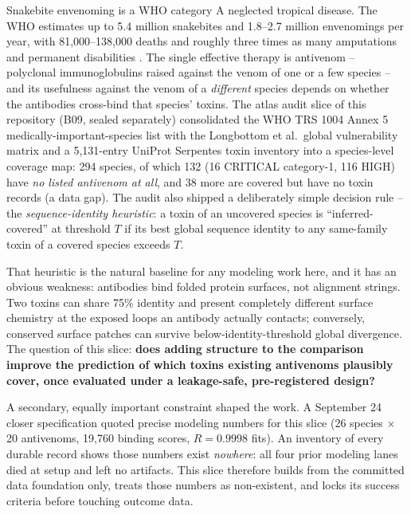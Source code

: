 \documentclass[11pt]{article}
\makeatletter
\renewcommand{\section}{\@startsection{section}{1}{\z@}{3.5ex plus 1ex minus .2ex}{2.3ex plus .2ex}{\Large\bfseries\color{paperblue}}}
\makeatother
\begin{document}
\section{Problem}
Snakebite envenoming is a WHO category A neglected tropical disease. The WHO estimates up to 5.4 million snakebites and 1.8--2.7 million envenomings per year, with 81,000--138,000 deaths and roughly three times as many amputations and permanent disabilities \cite{who-factsheet}. The single effective therapy is antivenom -- polyclonal immunoglobulins raised against the venom of one or a few species -- and its usefulness against the venom of a \emph{different} species depends on whether the antibodies cross-bind that species' toxins. The atlas audit slice of this repository (B09, sealed separately) consolidated the WHO TRS 1004 Annex 5 medically-important-species list \cite{who-trs1004} with the Longbottom et al.\ global vulnerability matrix \cite{longbottom2018} and a 5,131-entry UniProt Serpentes toxin inventory into a species-level coverage map: 294 species, of which 132 (16 CRITICAL category-1, 116 HIGH) have \emph{no listed antivenom at all}, and 38 more are covered but have no toxin records (a data gap). The audit also shipped a deliberately simple decision rule -- the \emph{sequence-identity heuristic}: a toxin of an uncovered species is ``inferred-covered'' at threshold $T$ if its best global sequence identity to any same-family toxin of a covered species exceeds $T$.

That heuristic is the natural baseline for any modeling work here, and it has an obvious weakness: antibodies bind folded protein surfaces, not alignment strings. Two toxins can share 75\% identity and present completely different surface chemistry at the exposed loops an antibody actually contacts; conversely, conserved surface patches can survive below-identity-threshold global divergence. The question of this slice: \textbf{does adding structure to the comparison improve the prediction of which toxins existing antivenoms plausibly cover, once evaluated under a leakage-safe, pre-registered design?}

A secondary, equally important constraint shaped the work. A September 24 closer specification quoted precise modeling numbers for this slice (26 species $\times$ 20 antivenoms, 19,760 binding scores, $R=0.9998$ fits). An inventory of every durable record shows those numbers exist \emph{nowhere}: all four prior modeling lanes died at setup and left no artifacts. This slice therefore builds from the committed data foundation only, treats those numbers as non-existent, and locks its success criteria before touching outcome data.
\end{document}
